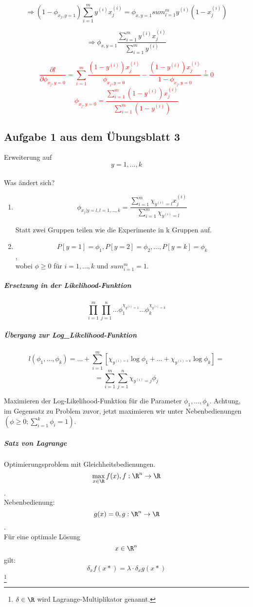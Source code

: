 \[ \Rightarrow (1-\phi_{x_j,y=1}) \sum_{i=1}^m y^{(i)} x_{j}^{(i)} = \phi_{x,y=1} sum_{i=1}^m y^{(i)} (1 - x_j^{(i)}) \]

\[ \Rightarrow \phi_{x,y=1} \frac{\sum_{i=1}^{m} y^{(i)}x_j^{(i)} }{\sum_{i=1}^m y^{(i)}} \]

\textcolor{red}{ \[ \frac{\partial l}{\partial \phi_{x_j,y=0}} = \sum_{i=1}^{m} \frac{(1 - y^{(i)})x_j^{(i)}}{\phi_{x_j,y=0}} - \frac{(1 - y^{(i)})x_j^{(i)}}{1 - \phi_{x_j,y=0}} \overset{!}{=} 0 \] 
\[ \phi_{x_j,y=0} = \frac{\sum_{i=1}^{m} (1 - y^{(i)})x_j^{(i)}}{\sum_{i=1}^{m}(1 - y^{(i)})} \]
}

\subsection{Aufgabe 1 aus dem Übungsblatt 3}
Erweiterung auf \[ y = {1,...,k}\] \\
Was ändert sich? 

\begin{enumerate}
\item \[ \phi_{x_j|y=l, l={1,...,k}} = \frac{\sum_{i=1}^{m} \chi_{ {y^{(i)} = l} }x_j^{(i)}}{\sum_{i=1}^{m} \chi_{ {y^{(i)} = l} }} \]

Statt zwei Gruppen teilen wie die Experimente in k Gruppen auf. 

\item \[ P[y=1] = \phi_1, P[y=2] = \phi_2, ..., P[y=k] = \phi_k \], \\
wobei $\phi \geq 0$ für $i=1,...,k$ und $sum_{i=1}^{m} = 1$.
\end{enumerate}

\subparagraph{Ersetzung in der Likelihood-Funktion}

\[ \prod_{i=1}^{m} \prod_{j=1}^{n} ... \phi_1^{\chi_{ {y^{(i)} = 1} }} ... \phi_k^{\chi_{ {y^{(i)} = k} }} \]

\subparagraph{Übergang zur Log_Likelihood-Funktion} 

\[ l(\phi_1,...,\phi_k) = ... + \sum_{i=1}^{m}[\chi_{ {y^{(i)=1} }} \log \phi_1 + ... + \chi_{ {y^{(i)=k} }} \log \phi_k ]= \]
\[ = \sum_{i=1}^{m}\sum_{j=1}^{n} \chi_{ {y^{(i)} = j} } \phi_j \]

Maximieren der Log-Likelihood-Funktion für die Parameter $\phi_1,...,\phi_k$. Achtung, im Gegensatz zu Problem zuvor, jetzt maximieren wir unter Nebenbedienungen $(\phi \geq 0; \sum_{i=1}^{k} \phi_i = 1)$. \\

\subparagraph{Satz von Lagrange}
Optimierungsproblem mit Gleichheitsbedienungen. \[ \max_{x \in \R} f(x), f:\R^n \rightarrow \R\]. \\
Nebenbedienung: \[ g(x) = 0, g:\R^n \rightarrow \R \]. \\
Für eine optimale Lösung \[ x \in \R^n \] gilt: 
\[ \delta_x f(x*) = \lambda \cdot \delta_x g(x*)\] \footnote{$\delta \in \R$ wird Lagrange-Multiplikator genannt.}






